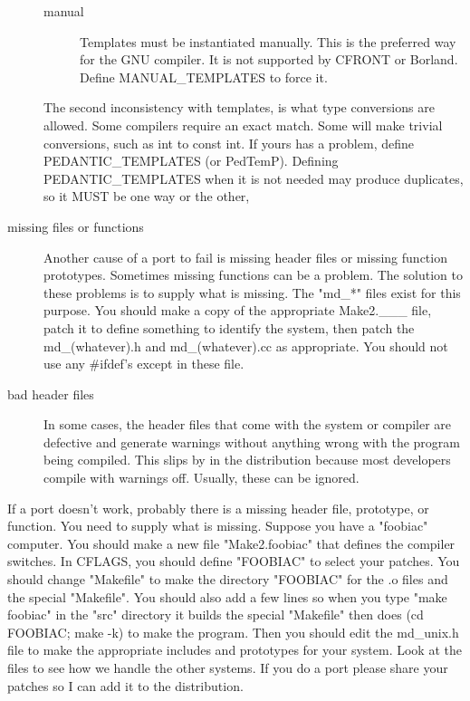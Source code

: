 \begin{description}
\begin{description}
\item[manual] Templates must be instantiated manually.  This is
the preferred way for the GNU compiler.  It is not supported by
CFRONT or Borland.  Define MANUAL\_TEMPLATES to force it.

\end{description}

The second inconsistency with templates, is what type conversions
are allowed.  Some compilers require an exact match.  Some will
make trivial conversions, such as int to const int.  If yours has
a problem, define PEDANTIC\_TEMPLATES (or PedTemP).  Defining
PEDANTIC\_TEMPLATES when it is not needed may produce duplicates,
so it MUST be one way or the other,

\item[missing files or functions] Another cause of a port to fail
is missing header files or missing function prototypes.  Sometimes
missing functions can be a problem.  The solution to these problems
is to supply what is missing.  The "md\_*" files exist for this
purpose.  You should make a copy of the appropriate Make2.\_\_\_
file, patch it to define something to identify the system, then
patch the md\_(whatever).h and md\_(whatever).cc as appropriate.
You should not use any \#ifdef's except in these file.

\item[bad header files] In some cases, the header files that come
with the system or compiler are defective and generate warnings
without anything wrong with the program being compiled.  This slips
by in the distribution because most developers compile with warnings
off.  Usually, these can be ignored.

\end{description}

If a port doesn't work, probably there is a missing header file,
prototype, or function.  You need to supply what is missing.
Suppose you have a "foobiac" computer.  You should make a new file
"Make2.foobiac" that defines the compiler switches.  In CFLAGS,
you should define "FOOBIAC" to select your patches.  You should
change "Makefile" to make the directory "FOOBIAC" for the .o files
and the special "Makefile".  You should also add a few lines so
when you type "make foobiac" in the "src" directory it builds the
special "Makefile" then does (cd FOOBIAC; make -k) to make the
program.  Then you should edit the md\_unix.h file to make the
appropriate includes and prototypes for your system.  Look at the
files to see how we handle the other systems.  If you do a port
please share your patches so I can add it to the distribution.

